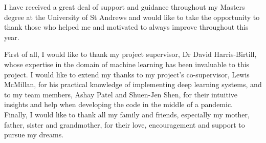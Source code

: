 I have received a great deal of support and guidance throughout my Masters degree at the University of St Andrews and would like to take the opportunity to thank those who helped me and motivated to always improve throughout this year.

First of all, I would like to thank my project supervisor, Dr David Harris-Birtill, whose expertise in the domain of machine learning has been invaluable to this project. I would like to extend my thanks to my project's co-supervisor, Lewis McMillan, for his practical knowledge of implementing deep learning systems, and to my team members, Ashay Patel and Shuen-Jen Shen, for their intuitive insights and help when developing the code in the middle of a pandemic.\\

Finally, I would like to thank all my family and friends, especially my mother, father, sister and grandmother, for their love, encouragement and support to pursue my dreams.
